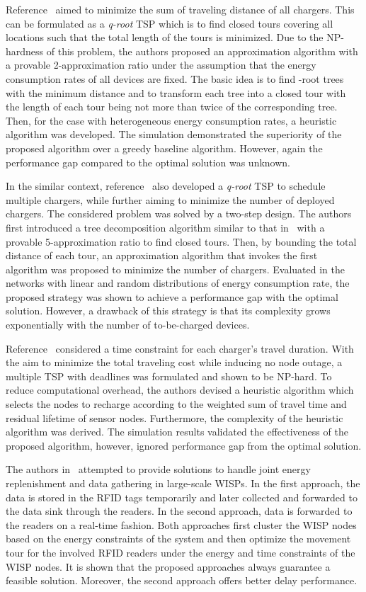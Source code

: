 \documentclass[twocolumn,10pt]{IEEEtran}
\begin{document}
Reference~\cite{W.2014Xu} aimed to minimize the sum of traveling distance of all chargers. This can be formulated as a \emph{q-root} TSP which is to find  closed tours covering all locations such that the total length of the  tours is minimized. Due to the NP-hardness of this problem, the authors proposed an approximation algorithm with a provable 2-approximation ratio under the assumption that the energy consumption rates of all devices are fixed. The basic idea is to find -root trees with the minimum distance and to transform each tree into a closed tour with the length of each tour being not more than twice of the corresponding tree. Then, for the case with heterogeneous energy consumption rates, a heuristic algorithm was developed. The simulation demonstrated the superiority of the proposed algorithm over a greedy baseline algorithm. However, again the performance gap compared to the optimal solution was unknown. 

In the similar context, reference~\cite{W.2014Liang} also developed a \emph{q-root} TSP to schedule multiple chargers, while further aiming to minimize the number of deployed chargers. The considered problem was solved by a two-step design. The authors first introduced a tree decomposition algorithm similar to that in~\cite{W.2014Xu} with a provable 5-approximation ratio to find  closed tours. Then, by bounding the total distance of each tour, an approximation algorithm that invokes the first algorithm was proposed to minimize the number of chargers. Evaluated in the networks with linear and random distributions of energy consumption rate, the proposed strategy was shown to achieve a  performance gap with the optimal solution. However, a drawback of this strategy is that its complexity grows exponentially with the number of to-be-charged devices.


Reference~\cite{C2013WangCoordination} considered a time constraint for each charger's travel duration.  With the aim to minimize the total traveling cost while inducing no node outage, a multiple TSP with deadlines was formulated and shown to be NP-hard. To reduce computational overhead, the authors devised a heuristic algorithm which selects the nodes to recharge according to the weighted sum of travel time and residual lifetime of sensor nodes. Furthermore, the complexity of the heuristic algorithm was derived. The simulation results validated the effectiveness of the proposed algorithm, however, ignored performance gap from the optimal solution.

The authors in~\cite{2015I.Farris} attempted to provide solutions to handle joint energy replenishment and data gathering in large-scale WISPs.
In the first approach, the data is stored in the RFID tags temporarily and later collected and forwarded to the data sink through the readers. In the second approach, data is forwarded to the readers on a real-time fashion. 
Both approaches first cluster the WISP nodes based on the energy constraints of the system and then optimize the movement tour for the involved RFID readers under the energy and time constraints of the WISP nodes.
It is shown that the proposed approaches always guarantee a feasible solution. Moreover, the second approach offers better delay performance.
\end{document}
